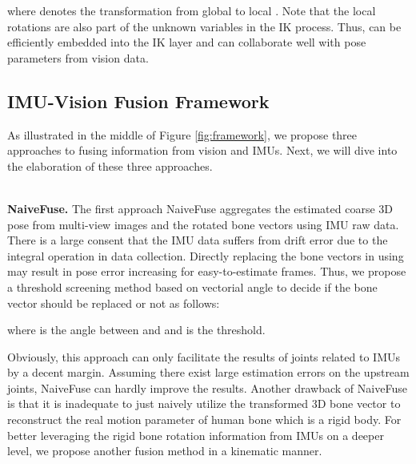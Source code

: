 \documentclass[lettersize,journal]{IEEEtran}
\begin{document}
where  denotes the transformation from global  to local . Note that the local rotations are also part of the unknown variables in the IK process. Thus,  can be efficiently embedded into the IK layer and can collaborate well with pose parameters  from vision data.

\subsection{IMU-Vision Fusion Framework}
\label{subsec:fusion}

As illustrated in the middle of Figure \ref{fig:framework}, we propose three approaches to fusing information from vision and IMUs. Next, we will dive into the elaboration of these three approaches.

~\\
\noindent \textbf{NaiveFuse.}
\quad The first approach NaiveFuse aggregates the estimated coarse 3D pose  from multi-view images and the rotated bone vectors  using IMU raw data. There is a large consent that the IMU data suffers from drift error due to the integral operation in data collection. Directly replacing the bone vectors in  using  may result in pose error increasing for easy-to-estimate frames. Thus, we propose a threshold screening method based on vectorial angle to decide if the bone vector should be replaced or not as follows:

where  is the angle between  and   and  is the threshold.

Obviously, this approach can only facilitate the results of joints related to IMUs by a decent margin. Assuming there exist large estimation errors on the upstream joints, NaiveFuse can hardly improve the results. Another drawback of NaiveFuse is that it is inadequate to just naively utilize the transformed 3D bone vector to reconstruct the real motion parameter of human bone which is a rigid body. For better leveraging the rigid bone rotation information from IMUs on a deeper level, we propose another fusion method in a kinematic manner.
\end{document}
